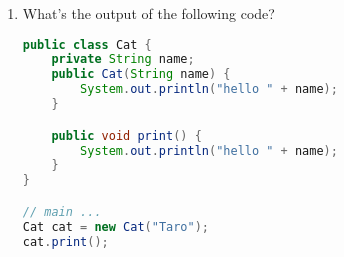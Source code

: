 \documentclass[letterpaper,12pt]{article}
\begin{document}
\begin{enumerate}
\item What's the output of the following code?
\begin{lstlisting}[language=Java]
public class Cat {
    private String name;
    public Cat(String name) {
        System.out.println("hello " + name);
    }

    public void print() {
        System.out.println("hello " + name);
    }
}

// main ...
Cat cat = new Cat("Taro");
cat.print();
\end{lstlisting}

\end{enumerate}
\end{document}
